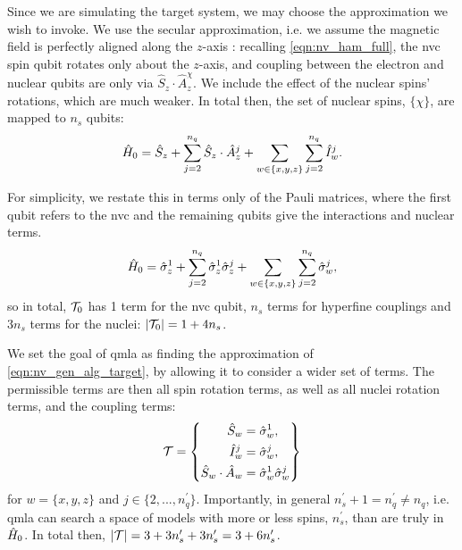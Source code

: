 Since we are simulating the target system, we may choose the approximation we wish to invoke. 
We use the secular approximation, i.e. we assume the magnetic field is perfectly aligned along 
    the $z$-axis \cite{rowan1965electron}:
    recalling \cref{eqn:nv_ham_full}, the \gls{nvc} spin qubit rotates only about the $z$-axis, 
    and coupling between the electron and nuclear qubits are only via $\hat{S}_z \cdot \hat{A}_z^{\chi}$.
We include the effect of the nuclear spins' rotations, which are much weaker. 
In total then, the set of nuclear spins, $\{\chi\}$, are mapped to $n_s$ qubits:
\begin{equation}
    \hat{H}_0 = \hat{S}_z 
    + \sum\limits_{ j=2 }^{n_q} \hat{S}_z \cdot \hat{A}_z^{j} 
    + \sum\limits_{w \in \{x,y,z\}} \sum\limits_{ j=2 }^{n_q} \hat{I}_w^{j}.
\end{equation}

For simplicity, we restate this in terms only of the Pauli matrices,
    where the first qubit refers to the \gls{nvc} and the remaining qubits give the interactions and nuclear terms.
\begin{equation}
    \label{eqn:nv_gen_alg_target}
    \hat{H}_0 = \hat{\sigma}_{z}^1 
    + \sum\limits_{ j=2 }^{n_q} \hat{\sigma}_{z}^1 \hat{\sigma}_{z}^j 
    + \sum\limits_{w \in \{x,y,z\}} \sum\limits_{ j=2 }^{n_q} \hat{\sigma}_w^j,
\end{equation}
    so in total, ${ \mathcal{T} }_0$ has 1 term for the \gls{nvc} qubit, $n_s$ terms for hyperfine couplings
    and $3n_s$ terms for the nuclei: $\left\lvert { \mathcal{T} }_0 \right\rvert = 1 + 4n_s$.
\par 

We set the goal of \gls{qmla} as finding the approximation of \cref{eqn:nv_gen_alg_target},
    by allowing it to consider a wider set of terms. 
The permissible terms are then all spin rotation terms, 
    as well as all nuclei rotation terms, and the coupling terms:
\begin{equation}
    \label{eqn:nv_terms}
    { \mathcal{T} } = \left\{ 
        \begin{split}    
            \hat{S}_w &= \hat{\sigma}_w^{1}, \\
            \hat{I}_w^{j} &= \hat{\sigma}_w^{j}, \\
            \hat{S}_w \cdot \hat{A}_w &= \hat{\sigma}_w^1 \hat{\sigma}_w^j
        \end{split}
    \right\}
\end{equation}
    for $w=\{ x, y, z \}$ and $j \in \{ 2, ..., n_q^{\prime} \}$.
Importantly, in general $n_s^{\prime}+1 = n_q^{\prime} \neq n_q$, i.e. \gls{qmla} can search a space of models
    with more or less spins, $n_s^{\prime}$, than are truly in $\hat{H}_0$.  
In total then, $\left\lvert { \mathcal{T} } \right\rvert = 3 + 3n_s^{\prime} + 3 n_s^{\prime} = 3 + 6 n_s^{\prime}$. 

